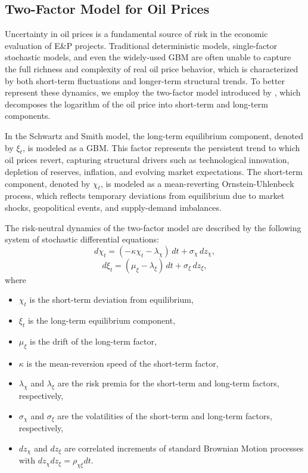 \documentclass[pdflatex,sn-basic]{sn-jnl}%
\theoremstyle{thmstyleone}%
\theoremstyle{thmstyletwo}%
\theoremstyle{thmstylethree}%
\begin{document}
\subsection{Two-Factor Model for Oil Prices}\label{subsec44}

Uncertainty in oil prices is a fundamental source of risk in the economic evaluation of E\&P projects. Traditional deterministic models, single-factor stochastic models, and even the widely-used GBM are often unable to capture the full richness and complexity of real oil price behavior, which is characterized by both short-term fluctuations and longer-term structural trends. To better represent these dynamics, we employ the two-factor model introduced by \cite{ref17}, which decomposes the logarithm of the oil price into short-term and long-term components.

In the Schwartz and Smith model, the long-term equilibrium component, denoted by $\xi_t$, is modeled as a GBM. This factor represents the persistent trend to which oil prices revert, capturing structural drivers such as technological innovation, depletion of reserves, inflation, and evolving market expectations. The short-term component, denoted by $\chi_t$, is modeled as a mean-reverting Ornstein-Uhlenbeck process, which reflects temporary deviations from equilibrium due to market shocks, geopolitical events, and supply-demand imbalances.

The risk-neutral dynamics of the two-factor model are described by the following system of stochastic differential equations:
\begin{equation}
    d\chi_t = (-\kappa \chi_t - \lambda_\chi)\,dt + \sigma_\chi\, d z_\chi, 
\label{eq:short_term}
\end{equation}
\begin{equation}
    d\xi_t = (\mu_\xi - \lambda_\xi)\,dt + \sigma_\xi\, d z_\xi, 
\label{eq:long_term}
\end{equation}
where
\begin{itemize}
    \item $\chi_t$ is the short-term deviation from equilibrium,
    \item $\xi_t$ is the long-term equilibrium component,
    \item $\mu_\xi$ is the drift of the long-term factor,
    \item $\kappa$ is the mean-reversion speed of the short-term factor,
    \item $\lambda_\chi$ and $\lambda_\xi$ are the risk premia for the short-term and long-term factors, respectively,
    \item $\sigma_\chi$ and $\sigma_\xi$ are the volatilities of the short-term and long-term factors, respectively,
    \item $d z_\chi$ and $d z_\xi$ are correlated increments of standard Brownian Motion processes with $d z_\chi d z_\xi = \rho_{\chi \xi} dt$.
\end{itemize}
\end{document}
